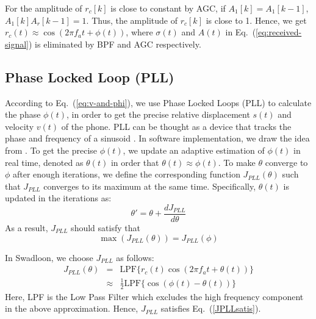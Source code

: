 \documentclass[]{sig-alternate-10pt}
\newcommand{\MYCUT}[1]{{ }}
\newcommand{\eqqref}[1]{Eq.~(\ref{#1})}
\def \ourprotocol{Swadloon\xspace}
\begin{document}
For the amplitude of $r_{c}[k]$ is close to constant by AGC, if
$A_{1}[k]=A_{1}[k-1]$, $A_{1}[k]A_{r}[k-1]=1$. Thus, the amplitude
of $r_{c}[k]$ is close to 1.
Hence, we get $r_c(t)\approx \cos(2\pi f_a t+\phi(t))$, where
$\sigma(t)$ and $A(t)$ in \eqqref{eq:received-signal} is eliminated by BPF and AGC respectively.

\subsection{Phase Locked Loop (PLL)}
\label{sec:stvt}
According to \eqqref{eq:v-and-phi}, we use Phase
Locked Loops (PLL) to calculate the phase $\phi(t)$, in order to get
the precise relative displacement $s(t)$ and velocity $v(t)$ of the phone.
PLL can be thought as a device that tracks the phase and frequency of
a sinusoid \cite{rice2008digital}. In software implementation, we draw
the idea from \cite{citeulike:5657344}.
To get the precise $\phi(t)$, we update an adaptive estimation of
$\phi(t)$ in real time, denoted as
$\theta(t)$ in order that $\theta(t)\approx \phi(t)$.  To make
$\theta$ converge to $\phi$ after enough iterations, we define the
corresponding function $J_{\textit{PLL}}(\theta)$ such that
$J_{\textit{PLL}}$ converges to its maximum at the same time.
Specifically, $\theta(t)$ is updated in the iterations as:
\begin{equation}
    \theta'=\theta+\frac{dJ_{\textit{PLL}}}{d\theta}
        \label{initialadapt}
\end{equation}
As a result, $J_{\textit{PLL}}$ should satisfy that
\begin{equation}
 \max (J_{\textit{PLL}}(\theta))=J_{\textit{PLL}}(\phi)
 \label{JPLLsatis}
\end{equation}

In \ourprotocol, we choose $J_{\textit{PLL}}$ as follows:
\begin{eqnarray*}
    J_{\textit{PLL}}(\theta) & = & \textrm{LPF}\{r_c(t)\cos(2\pi f_{a}t+\theta(t))\}\nonumber \\
\MYCUT{ & = & \frac{1}{2}\textrm{LPF}\{A(t)\cos(\phi(t)-\theta(t))\nonumber \\
 &  & \ \ \ \ +A(t)\cos(4\pi f_{a}t+\theta(t)+\phi(t))\nonumber \\
 &  & \ \ \ \ +2\sigma(t)\cos(2\pi f_{a}t+\theta(t))\}\nonumber \\
 & = & \frac{1}{2}\textrm{LPF}\{A(t)\cos(\phi(t)-\theta(t))\}\nonumber \\
 &  & \ \ \ \ +\frac{1}{2}\textrm{LPF}\{A(t)\cos(4\pi f_{a}t+\theta(t)+\phi(t))\}\nonumber \\
 &  & \ \ \ \ +\textrm{LPF}\{\sigma(t)\cos(2\pi
  f_{a}t+\theta(t))\}\nonumber \\} & \approx & \frac{1}{2}\textrm{LPF}\{\cos(\phi(t)-\theta(t))\}
\end{eqnarray*}
Here, LPF is the Low Pass Filter which excludes the high frequency component in the above approximation.
Hence, $J_{\textit{PLL}}$ satisfies \eqqref{JPLLsatis}.
\end{document}
